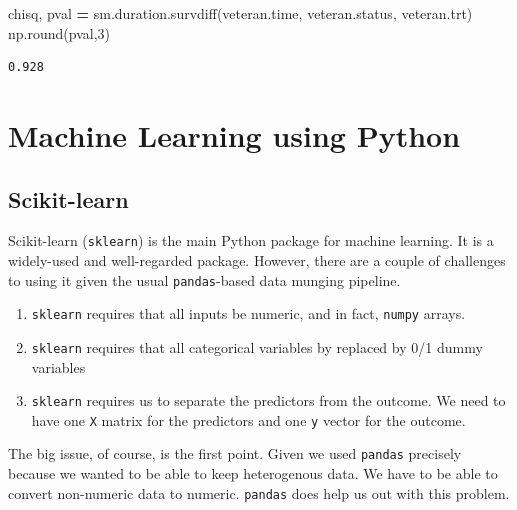 \documentclass[
  letterpaper,
]{scrbook}
\newenvironment{Shaded}{\begin{snugshade}}{\end{snugshade}}
\newcommand{\BuiltInTok}[1]{#1}
\newcommand{\DecValTok}[1]{\textcolor[rgb]{0.00,0.00,0.81}{#1}}
\newcommand{\NormalTok}[1]{#1}
\newcommand{\OperatorTok}[1]{\textcolor[rgb]{0.81,0.36,0.00}{\textbf{#1}}}
\providecommand{\tightlist}{%
  \setlength{\itemsep}{0pt}\setlength{\parskip}{0pt}}
\begin{document}
\begin{Shaded}
\begin{Highlighting}[]
\NormalTok{chisq, pval }\OperatorTok{=}\NormalTok{ sm.duration.survdiff(veteran.time, veteran.status, veteran.trt)}
\NormalTok{np.}\BuiltInTok{round}\NormalTok{(pval,}\DecValTok{3}\NormalTok{)}
\end{Highlighting}
\end{Shaded}

\begin{verbatim}
0.928
\end{verbatim}

\hypertarget{machine-learning-using-python}{%
\chapter{Machine Learning using Python}\label{machine-learning-using-python}}

\hypertarget{scikit-learn}{%
\section{Scikit-learn}\label{scikit-learn}}

Scikit-learn (\texttt{sklearn}) is the main Python package for machine learning. It is a widely-used and well-regarded package. However, there are a couple of challenges to using it given the usual \texttt{pandas}-based data munging pipeline.

\begin{enumerate}
\def\labelenumi{\arabic{enumi}.}
\tightlist
\item
  \texttt{sklearn} requires that all inputs be numeric, and in fact, \texttt{numpy} arrays.
\item
  \texttt{sklearn} requires that all categorical variables by replaced by 0/1 dummy variables
\item
  \texttt{sklearn} requires us to separate the predictors from the outcome. We need to have one \texttt{X} matrix for the predictors and one \texttt{y} vector for the outcome.
\end{enumerate}

The big issue, of course, is the first point. Given we used \texttt{pandas} precisely because we wanted to be able to keep heterogenous data. We have to be able to convert non-numeric data to numeric. \texttt{pandas} does help us out with this problem.
\end{document}
